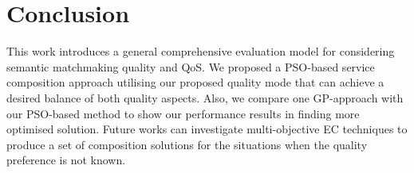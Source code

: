\documentclass{IEEEtran}
\begin{document}
\section{Conclusion}\label{conclusion}
This work introduces a general comprehensive evaluation model for considering semantic matchmaking quality and QoS. We proposed a PSO-based service composition approach utilising our proposed quality mode that can achieve a desired balance of both quality aspects. Also, we compare one GP-approach with our PSO-based method to show our performance results in finding more optimised solution. Future works can investigate multi-objective EC techniques to produce a set of composition solutions for the situations when the quality preference is not known.




\end{document}
